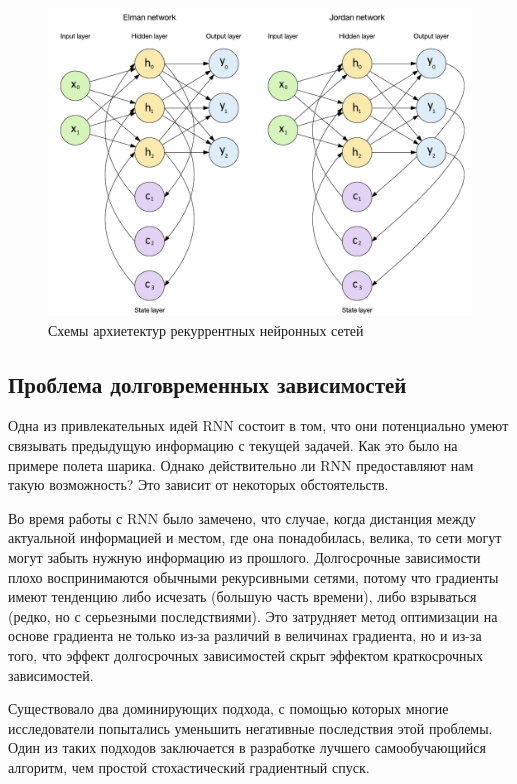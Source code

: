 	\begin{figure}[ht!]
		\centering
		\captionsetup{justification=centering}
		\includegraphics[width=140mm]{img/RNN.png}
		\caption{Схемы архиетектур рекуррентных нейронных сетей}
	\end{figure}
	
	\subsection{Проблема долговременных зависимостей}
	
	Одна из привлекательных идей RNN состоит в том, что они потенциально умеют связывать предыдущую информацию с текущей задачей. Как это было на примере полета шарика. Однако действительно ли RNN предоставляют нам такую возможность? Это зависит от некоторых обстоятельств.

	Во время работы с RNN было замечено, что случае, когда дистанция между актуальной информацией и местом, где она понадобилась, велика, то сети могут могут забыть нужную информацию из прошлого. Долгосрочные зависимости плохо воспринимаются обычными рекурсивными сетями, потому что градиенты имеют тенденцию либо исчезать (большую часть времени), либо взрываться (редко, но с серьезными последствиями). Это затрудняет метод оптимизации на основе градиента не только из-за различий в величинах градиента, но и из-за того, что эффект долгосрочных зависимостей скрыт эффектом краткосрочных зависимостей. 
	
	Существовало два доминирующих подхода, с помощью которых многие исследователи попытались уменьшить негативные последствия этой проблемы. Один из таких подходов заключается в разработке лучшего самообучающийся алгоритм, чем простой стохастический градиентный спуск.
	
